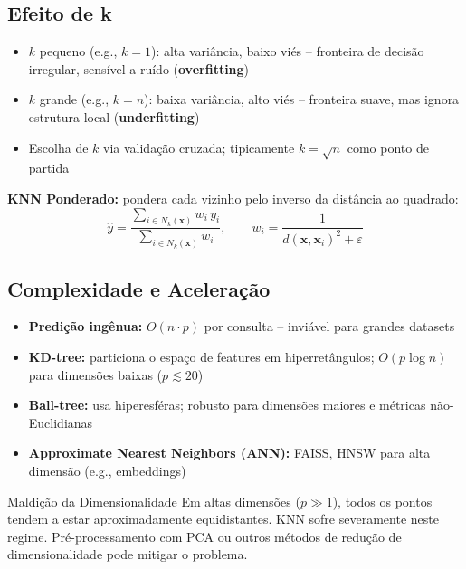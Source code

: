 \documentclass[12pt,a4paper]{article}
\begin{document}
\subsection{Efeito de k}

\begin{itemize}
  \item $k$ pequeno (e.g., $k=1$): alta variância, baixo viés -- fronteira de decisão irregular, sensível a ruído (\textbf{overfitting})
  \item $k$ grande (e.g., $k=n$): baixa variância, alto viés -- fronteira suave, mas ignora estrutura local (\textbf{underfitting})
  \item Escolha de $k$ via validação cruzada; tipicamente $k = \sqrt{n}$ como ponto de partida
\end{itemize}

\textbf{KNN Ponderado:} pondera cada vizinho pelo inverso da distância ao quadrado:
\[
  \hat{y} = \frac{\sum_{i \in N_k(\mathbf{x})} w_i\, y_i}{\sum_{i \in N_k(\mathbf{x})} w_i}, \qquad w_i = \frac{1}{d(\mathbf{x}, \mathbf{x}_i)^2 + \varepsilon}
\]

\subsection{Complexidade e Aceleração}

\begin{itemize}
  \item \textbf{Predição ingênua:} $O(n \cdot p)$ por consulta -- inviável para grandes datasets
  \item \textbf{KD-tree:} particiona o espaço de features em hiperretângulos; $O(p \log n)$ para dimensões baixas ($p \lesssim 20$)
  \item \textbf{Ball-tree:} usa hiperesféras; robusto para dimensões maiores e métricas não-Euclidianas
  \item \textbf{Approximate Nearest Neighbors (ANN):} FAISS, HNSW para alta dimensão (e.g., embeddings)
\end{itemize}

\begin{atencaobox}{Maldição da Dimensionalidade}
Em altas dimensões ($p \gg 1$), todos os pontos tendem a estar aproximadamente equidistantes. KNN sofre severamente neste regime. Pré-processamento com PCA ou outros métodos de redução de dimensionalidade pode mitigar o problema.
\end{atencaobox}

\end{document}
